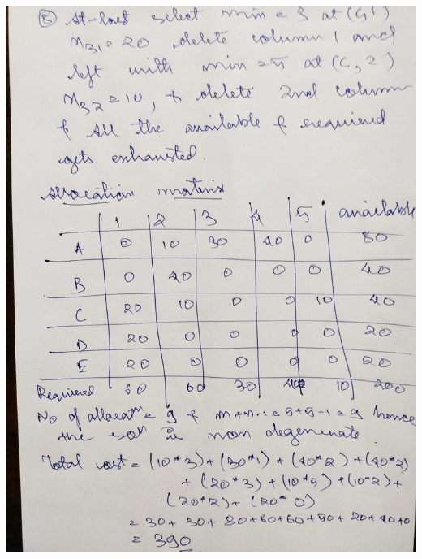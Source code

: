 \documentclass[12pt, letterpaper, twoside]{book}
\begin{document}
\includegraphics[width=\paperwidth, height=\paperheight]{Page13}
\end{document}
